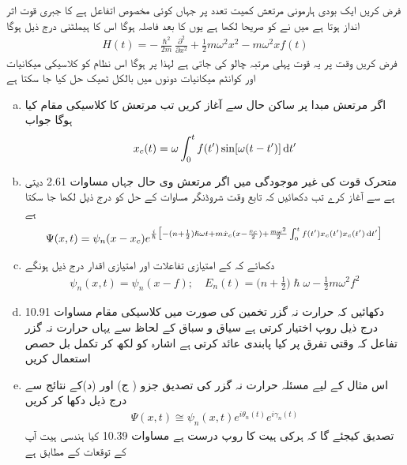 فرض کریں ایک بودی ہارمونی مرتعش کمیت  تعدد  پر  جہاں  کوئی مخصوص اتفاعل ہے کا جبری قوت اثر انداز ہوتا ہے میں نے  کو صريحا لکھا ہے یوں  کا بعد فاصلہ ہوگا اس کا ہیملٹنی درج ذیل ہوگا 
\begin{align}
H(t) = - \frac{\hslash^2}{2m} \frac{\partial^2}{\partial x^2} + \frac{1}{2} m \omega^2 x^2 - m \omega^2 x f (t)
\end{align}
فرض کریں وقت  پر یہ قوت پہلی مرتبہ چالو کی جاتی ہے لہذا  پر  ہوگا اس نظام کو کلاسیکی میکانیات اور کوانٹم میکانیات دونوں میں بالکل ٹھیک حل کیا جا سکتا ہے 
\begin{enumerate}[a.]
\item
اگر مرتعش مبدا پر ساکن حال  سے آغاز کریں تب مرتعش کا کلاسیکی مقام کیا ہوگا جواب 
\begin{align}
x_c (t) = \omega \int_0^{t} f(t') \sin [\omega (t - t')] \dif t'
\end{align}
\item
متحرک قوت کی غیر موجودگی میں اگر مرتعش  وی حال  جہاں  مساوات 2.61 دیتی ہے سے آغاز کرے تب دکھائیں کہ تابع وقت شروڈنگر مساوات کے حل کو درج ذیل لکھا جا سکتا ہے 
\begin{align}
\Psi (x, t) = \psi_n (x - x_c) e^{\frac{i}{\hslash} \big[- (n + \frac{1}{2}) \hslash \omega t + m \dot{x}_c (x - \frac{x_c}{2}) + \frac{m \omega^2}{2} \int_0^t f (t') x_c (t') x_c (t') \dif t'\big]}
\end{align}
\item
دکھائے کہ  کے امتیازی تفاعلات اور امتیازی اقدار درج ذیل ہونگے 
\begin{align}
\psi_n (x, t) = \psi_n (x - f); \quad E_n (t) = \big ( n + \frac{1}{2} \big ) \hslash \omega - \frac{1}{2} m \omega^2 f^2
\end{align}
\item
دکھائیں کہ حرارت نہ گزر تخمین کی صورت میں کلاسیکی مقام مساوات 10.91 درج ذیل روپ اختیار کرتی ہے  سیاق و سباق کے لحاظ سے یہاں حرارت نہ گزر تفاعل  کہ وقتی تفرق پر کیا پابندی عائد کرتی ہے اشارہ  کو  لکھ کر تکمل بل حصص استعمال کریں 
\item
اس مثال کے لیے مسئلہ حرارت نہ گزر کی تصدیق جزو ( ج) اور (د)کے نتائج سے درج ذیل دکھا کر کریں 
\begin{align}
\Psi (x, t) \cong \psi_n (x, t) e^{i \theta_n (t)} e^{i \gamma_n (t)}
\end{align}
تصدیق کیجئے گا کہ ہرکی ہیت کا روپ درست ہے مساوات 10.39 کیا ہندسی ہیت آپ کے توقعات کے مطابق ہے  
\end{enumerate}
